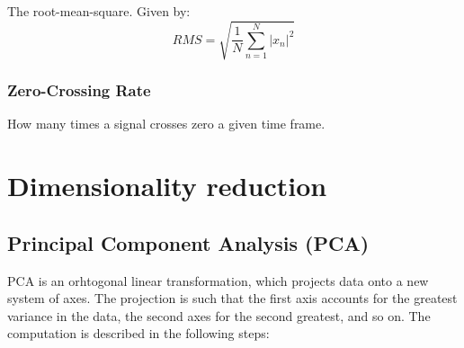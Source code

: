 \documentclass[a4paper, 12pt, twoside]{report}
\begin{document}
    The root-mean-square. Given by:
    \[ RMS = \sqrt{\frac{1}{N}\sum^{N}_{n=1}|x_{n}|^{2}}\]

\subsubsection{Zero-Crossing Rate }
\label{sec:org7b27629}

    How many times a signal crosses zero a given time frame.
\section{Dimensionality reduction}
\label{sec:orgb502774}
\subsection{Principal Component Analysis (PCA)}
\label{sec:org93f3c9b}

PCA is an orhtogonal linear transformation, which projects data onto a new system of axes. The projection is such that the first axis accounts for the greatest variance in the data, the second axes for the second greatest, and so on. The computation is described in the following steps:
\end{document}
